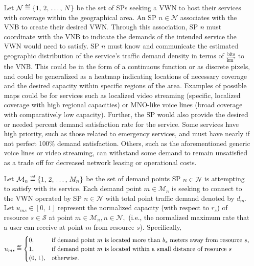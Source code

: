 \documentclass[12pt,dvipsnames]{report}
\newcommand\defeq{\mathrel{\overset{\makebox[0pt]{\mbox{\normalfont\tiny\sffamily def}}}{=}}}
\begin{document}
Let $\mathcal{N} \defeq \left\{1,\, 2,\, \ldots,\, N\right\}$ be the set of SPs seeking a VWN to host their services with coverage within the geographical area.  An SP $n \in \mathcal{N}$ associates with the VNB to create their desired VWN.  Through this association, SP $n$ must coordinate with the VNB to indicate the demands of the intended service the VWN would need to satisfy.  SP $n$ must know and communicate the estimated geographic distribution of the service's traffic demand density in terms of $\frac{\text{bits}}{\text{km}^2}$ to the VNB.  This could be in the form of a continuous function or as discrete pixels, and could be generalized as a heatmap indicating locations of necessary coverage and the desired capacity within specific regions of the area.  Examples of possible maps could be for services such as localized video streaming (specific, localized coverage with high regional capacities) or MNO-like voice lines (broad coverage with comparatively low capacity).  Further, the SP would also provide the desired or needed percent demand satisfaction rate for the service.  Some services have high priority, such as those related to emergency services, and must have nearly if not perfect 100\% demand satisfaction.  Others, such as the aforementioned generic voice lines or video streaming, can withstand some demand to remain unsatisfied as a trade off for decreased network leasing or operational costs.

Let $\mathcal{M}_n \defeq \left\{1,\, 2,\, \ldots,\, M_n\right\}$ be the set of demand points SP $n \in \mathcal{N}$ is attempting to satisfy with its service.  Each demand point $m \in \mathcal{M}_n$ is seeking to connect to the VWN operated by SP $n \in \mathcal{N}$ with total point traffic demand denoted by $d_m$.  Let $u_{ms} \in [0,\, 1]$ represent the normalized capacity (with respect to $r_s$) of resource $s \in \mathcal{S}$ at point $m \in \mathcal{M}_n, n \in \mathcal{N},$ (i.e., the normalized maximum rate that a user can receive at point $m$ from resource $s$).  Specifically,
\begin{equation}
u_{ms} \defeq
	\begin{cases}
		0,& \text{if demand point $m$ is located more than $b_s$ meters away from resource $s$,}\\
		1,& \text{if demand point $m$ is located within a small distance of resource $s$}\\
		(0,\, 1),& \text{otherwise.}
	\end{cases}
\end{equation} \label{eq:ums}
\end{document}
